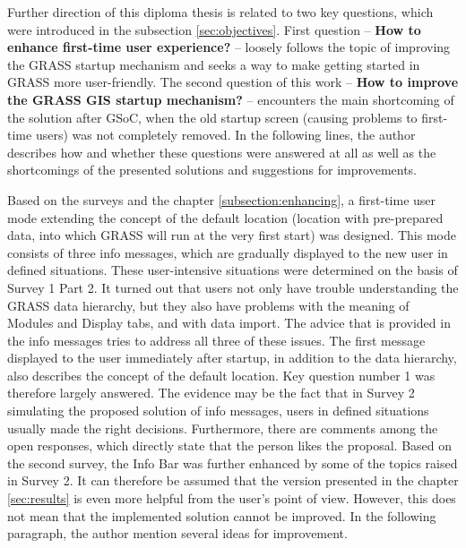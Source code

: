 \documentclass[a4paper,10pt,twoside]{article}
\begin{document}
Further direction of this diploma thesis is related to two key
questions, which were introduced in the subsection
\ref{sec:objectives}. First question -- \textbf{How to enhance
  first-time user experience?} -- loosely follows the topic of
improving the GRASS startup mechanism and seeks a way to make getting
started in GRASS more user-friendly. The second question of this work
-- \textbf{How to improve the GRASS GIS startup mechanism?} --
encounters the main shortcoming of the solution after GSoC, when the
old startup screen (causing problems to first-time users) was not
completely removed. In the following lines, the author describes how
and whether these questions were answered at all as well as the
shortcomings of the presented solutions and suggestions for
improvements.

Based on the surveys and the chapter \ref{subsection:enhancing}, a
first-time user mode extending the concept of the default location
(location with pre-prepared data, into which GRASS will run at the
very first start) was designed. This mode consists of three info
messages, which are gradually displayed to the new user in defined
situations. These user-intensive situations were determined on the
basis of Survey 1 Part 2. It turned out that users not only have
trouble understanding the GRASS data hierarchy, but they also have
problems with the meaning of Modules and Display tabs, and with data
import. The advice that is provided in the info messages tries to
address all three of these issues. The first message displayed to the
user immediately after startup, in addition to the data hierarchy,
also describes the concept of the default location. Key question
number 1 was therefore largely answered. The evidence may be the fact
that in Survey 2 simulating the proposed solution of info messages,
users in defined situations usually made the right
decisions. Furthermore, there are comments among the open responses,
which directly state that the person likes the proposal. Based on the
second survey, the Info Bar was further enhanced by some of the topics
raised in Survey 2. It can therefore be assumed that the version
presented in the chapter \ref{sec:results} is even more helpful from
the user's point of view. However, this does not mean that the
implemented solution cannot be improved. In the following paragraph,
the author mention several ideas for improvement.
\end{document}
